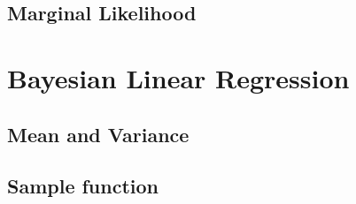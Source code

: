	\subsection{Marginal Likelihood}

\section{Bayesian Linear Regression}

	\subsection{Mean and Variance}

	\subsection{Sample function}



